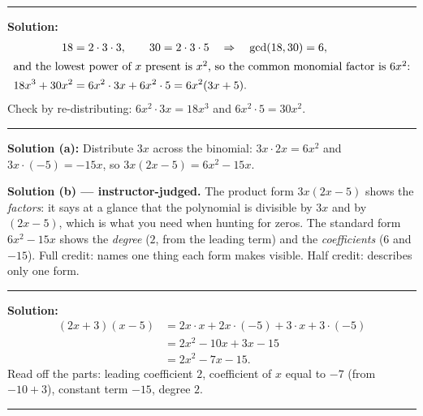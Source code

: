 \documentclass[12pt]{article}
\begin{document}
\vspace{0.2cm}\noindent\rule{\linewidth}{0.2pt}


\textbf{Solution:}
\begin{align*}
  18 &= 2\cdot 3\cdot 3, \qquad 30 = 2\cdot 3\cdot 5 \quad\Rightarrow\quad \gcd(18,30) = 6,\\
  \intertext{and the lowest power of $x$ present is $x^2$, so the common monomial factor is $6x^2$:}
  18x^3 + 30x^2 &= 6x^2\cdot 3x + 6x^2 \cdot 5 = 6x^2(3x+5).
\end{align*}
Check by re-distributing: $6x^2 \cdot 3x = 18x^3$ and $6x^2\cdot 5 = 30x^2$. 

\vspace{0.2cm}\noindent\rule{\linewidth}{0.2pt}


\textbf{Solution (a):} \quad Distribute $3x$ across the binomial:
$3x\cdot 2x = 6x^2$ and $3x\cdot(-5) = -15x$, so $3x(2x-5) = 6x^2 - 15x$. 

\noindent\textbf{Solution (b) --- instructor-judged.} The product form $3x(2x-5)$ shows the
\textit{factors}: it says at a glance that the polynomial is divisible by $3x$ and by $(2x-5)$,
which is what you need when hunting for zeros. The standard form $6x^2 - 15x$ shows the
\textit{degree} ($2$, from the leading term) and the \textit{coefficients} ($6$ and $-15$).
Full credit: names one thing each form makes visible. Half credit: describes only one form.

\vspace{0.2cm}\noindent\rule{\linewidth}{0.2pt}


\textbf{Solution:}
\begin{align*}
  (2x+3)(x-5) &= 2x\cdot x + 2x\cdot(-5) + 3\cdot x + 3\cdot(-5)\\
              &= 2x^2 - 10x + 3x - 15\\
              &= 2x^2 - 7x - 15.
\end{align*}
Read off the parts: leading coefficient $2$, coefficient of $x$ equal to $-7$
(from $-10 + 3$), constant term $-15$, degree $2$. 

\vspace{0.2cm}\noindent\rule{\linewidth}{0.2pt}
\end{document}
